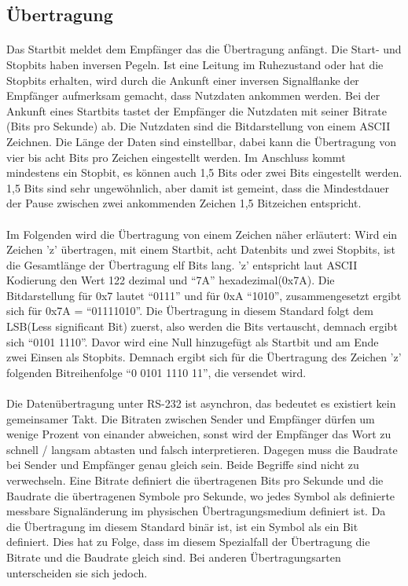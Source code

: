\subsection{Übertragung}
\paragraph{}
Das Startbit meldet dem Empfänger das die Übertragung anfängt. Die Start- und Stopbits haben inversen Pegeln. Ist eine Leitung im Ruhezustand oder hat die Stopbits erhalten, wird durch die Ankunft einer inversen Signalflanke der Empfänger aufmerksam gemacht, dass Nutzdaten ankommen werden. Bei der Ankunft eines Startbits tastet der Empfänger die Nutzdaten mit seiner Bitrate (Bits pro Sekunde) ab. Die Nutzdaten sind die Bitdarstellung von einem ASCII Zeichnen. Die Länge der Daten sind einstellbar, dabei kann die Übertragung von vier bis acht Bits pro Zeichen eingestellt werden. Im Anschluss kommt mindestens ein Stopbit, es können auch 1,5 Bits oder zwei Bits eingestellt werden. 1,5 Bits sind sehr ungewöhnlich, aber damit ist gemeint, dass die Mindestdauer der Pause zwischen zwei ankommenden Zeichen 1,5 Bitzeichen entspricht. 

\paragraph{}
Im Folgenden wird die Übertragung von einem Zeichen näher erläutert:
Wird ein Zeichen 'z' übertragen, mit einem Startbit, acht Datenbits und zwei Stopbits, ist die Gesamtlänge der Übertragung elf Bits lang. 'z' entspricht laut ASCII Kodierung den Wert 122 dezimal und "`7A"' hexadezimal(0x7A). Die Bitdarstellung für 0x7 lautet "`0111"' und für 0xA "`1010"', zusammengesetzt ergibt sich für 0x7A = "`01111010"'. Die Übertragung in diesem Standard folgt dem LSB(Less significant Bit) zuerst, also werden die Bits vertauscht, demnach ergibt sich "`0101 1110"'. Davor wird eine Null hinzugefügt als Startbit und am Ende zwei Einsen als Stopbits. Demnach ergibt sich für die Übertragung des Zeichen 'z' folgenden Bitreihenfolge "`0 0101 1110 11"', die versendet wird.

\paragraph{}
Die Datenübertragung unter RS-232 ist asynchron, das bedeutet es existiert kein gemeinsamer Takt. Die Bitraten zwischen Sender und Empfänger dürfen um wenige Prozent von einander abweichen, sonst wird der Empfänger das Wort zu schnell / langsam abtasten und falsch interpretieren. Dagegen muss die Baudrate bei Sender und Empfänger genau gleich sein. Beide Begriffe sind nicht zu verwechseln. Eine Bitrate definiert die übertragenen Bits pro Sekunde und die Baudrate die übertragenen Symbole pro Sekunde, wo jedes Symbol als definierte messbare Signaländerung im physischen Übertragungsmedium definiert ist. Da die Übertragung im diesem Standard binär ist, ist ein Symbol als ein Bit definiert. Dies hat zu Folge, dass im diesem Spezialfall der Übertragung die Bitrate und die Baudrate gleich sind. Bei anderen Übertragungsarten unterscheiden sie sich jedoch.

